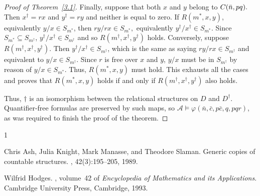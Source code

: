 \documentclass[12pt,fullpage]{article}
\theoremstyle{definition}
\theoremstyle{remark}
\newcommand{\A}{\mathcal{A}}
\renewcommand{\phi}{\varphi}
\begin{document}
\begin{proof}[Proof of Theorem~\ref{3.1}]
Finally, suppose that both $x$ and $y$ belong to $C(\bar{n},pq).$  Then $x^\dagger=rx$ and $y^\dagger=ry$ and neither is equal to zero.  If $R(m^*,x,y)$, equivalently $y/x\in S_{m^*}$, then $ry/rx\in S_{m^*},$ equivalently $y^\dagger/x^\dagger\in S_{m^*}$.  Since $S_{m^*}\subseteq S_{m^\dagger}$, $y^\dagger/x^\dagger\in S_{m^\dagger}$ and so $R(m^\dagger,x^\dagger,y^\dagger)$ holds.    Conversely, suppose $R(m^\dagger,x^\dagger,y^\dagger)$.  Then  $y^\dagger/x^\dagger\in S_{m^\dagger}$, which is the same as saying $ry/rx\in S_{m^\dagger}$ and equivalent to $y/x\in S_{m^\dagger}.$   Since $r$ is free over $x$ and $y$, $y/x$ must be in $S_{m^\dagger}$ by reason of $y/x\in S_{m^*}$.  Thus, $R(m^*,x,y)$ must hold.  This exhausts all  the cases and proves that $R(m^*,x,y)$ holds if and only if $R(m^\dagger,x^\dagger,y^\dagger)$ also holds.

  Thus, $\dagger$ is an isomorphism between the relational structures on $D$ and $D^\dagger$.  Quantifier-free formulas are preserved by such maps, so  $\A\models\phi(\bar{n},\bar{c},p\bar{c},q,pqr)$, as was required to finish the proof of the theorem.
\end{proof}
  



\begin{thebibliography}{1}

Chris Ash, Julia Knight, Mark Manasse, and Theodore Slaman.
\newblock Generic copies of countable structures.
, 42(3):195--205, 1989.

Wilfrid Hodges.
, volume~42 of {\em Encyclopedia of Mathematics and
  its Applications}.
\newblock Cambridge University Press, Cambridge, 1993.

\end{thebibliography}
\end{document}
